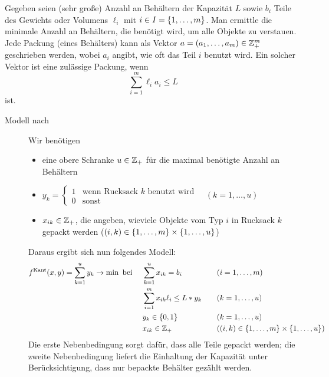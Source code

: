 Gegeben seien (sehr große) Anzahl an Behältern der Kapazität $L$ sowie $b_i$ Teile des Gewichts oder Volumens $\ell_i$ mit $i \in I = \left\{ 1, \dots , m \right\}$. Man ermittle die minimale Anzahl an Behältern, die benötigt wird, um alle Objekte zu verstauen.
Jede Packung (eines Behälters) kann als Vektor $a = (a_1 , \dots , a_m) \in \mathbb{Z}_+^m$ geschrieben werden, wobei $a_i$ angibt, wie oft das Teil $i$ benutzt wird. Ein solcher Vektor ist eine zulässige Packung, wenn 
\begin{equation*}
	\sum_{i=1}^m \ell_i a_i \le L
\end{equation*} 
ist.

\begin{description}
	\item[Modell nach ] Wir benötigen 
	\begin{itemize}[nolistsep]
		\item eine obere Schranke $u \in \mathbb{Z}_+$ für die maximal benötigte Anzahl an Behältern
		\item $y_k = \begin{cases}
		1 & \text{wenn Rucksack } k \text{ benutzt wird} \\ 0 & \text{sonst}
		\end{cases} \quad (k = 1 , \dots , u)$
		\item $x_{ik} \in \mathbb{Z}_+$, die angeben, wieviele Objekte vom Typ $i$ in Rucksack $k$ gepackt werden ($(i,k) \in \left\{ 1, \dots , m \right\} \times \left\{ 1, \dots , u \right\}$)
	\end{itemize}
	Daraus ergibt sich nun folgendes Modell:
	\begin{equation*}
		\begin{aligned}
		f^\text{Kant}(x,y) = \sum_{k=1}^u y_k \to \min \text{ bei } \quad & \sum_{k=1}^u x_{ik} = b_i \quad &&(i = 1, \dots , m) \\
		& \sum_{i=1}^m x_{ik} \ell_i \le L * y_k \quad &&(k = 1 , \dots , u) \\
		& y_k \in \left\{ 0,1 \right\} \quad &&(k = 1 , \dots , u) \\
		& x_{ik} \in \mathbb{Z}_+ \quad &&((i,k) \in \left\{ 1, \dots , m \right\} \times \left\{ 1, \dots , u \right\})
		\end{aligned}
	\end{equation*}
	Die erste Nebenbedingung sorgt dafür, dass alle Teile gepackt werden; die zweite Nebenbedingung liefert die Einhaltung der Kapazität unter Berücksichtigung, dass nur bepackte Behälter gezählt werden.


\end{description}
